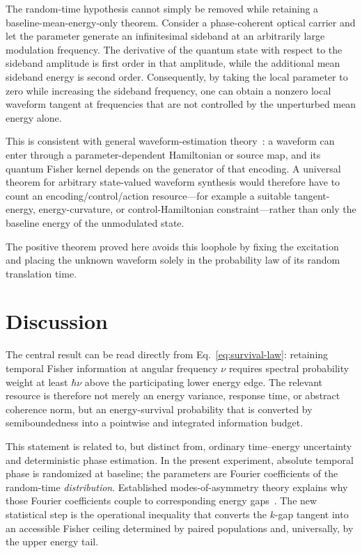 \documentclass[aps,pra,reprint,amsmath,amssymb,longbibliography]{revtex4-2}
\begin{document}
The random-time hypothesis cannot simply be removed while retaining a baseline-mean-energy-only theorem.  Consider a phase-coherent optical carrier and let the parameter generate an infinitesimal sideband at an arbitrarily large modulation frequency.  The derivative of the quantum state with respect to the sideband amplitude is first order in that amplitude, while the additional mean sideband energy is second order.  Consequently, by taking the local parameter to zero while increasing the sideband frequency, one can obtain a nonzero local waveform tangent at frequencies that are not controlled by the unperturbed mean energy alone.

This is consistent with general waveform-estimation theory~\cite{TsangWisemanCaves2011}: a waveform can enter through a parameter-dependent Hamiltonian or source map, and its quantum Fisher kernel depends on the generator of that encoding.  A universal theorem for arbitrary state-valued waveform synthesis would therefore have to count an encoding/control/action resource---for example a suitable tangent-energy, energy-curvature, or control-Hamiltonian constraint---rather than only the baseline energy of the unmodulated state.

The positive theorem proved here avoids this loophole by fixing the excitation and placing the unknown waveform solely in the probability law of its random translation time.

\section{Discussion}
\label{sec:discussion}

The central result can be read directly from Eq.~\eqref{eq:survival-law}: retaining temporal Fisher information at angular frequency $\nu$ requires spectral probability weight at least $\hbar\nu$ above the participating lower energy edge.  The relevant resource is therefore not merely an energy variance, response time, or abstract coherence norm, but an energy-survival probability that is converted by semiboundedness into a pointwise and integrated information budget.

This statement is related to, but distinct from, ordinary time--energy uncertainty and deterministic phase estimation.  In the present experiment, absolute temporal phase is randomized at baseline; the parameters are Fourier coefficients of the random-time \emph{distribution}.  Established modes-of-asymmetry theory explains why those Fourier coefficients couple to corresponding energy gaps~\cite{MarvianSpekkens2014Modes}.  The new statistical step is the operational inequality that converts the $k$-gap tangent into an accessible Fisher ceiling determined by paired populations and, universally, by the upper energy tail.
\end{document}
